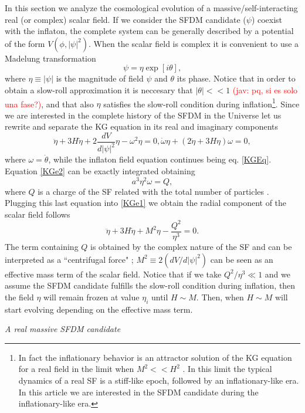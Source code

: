 \documentclass[amssymb,twocolumn,prd,nofootinbib,showpacs]{revtex4-1}
\newcommand{\jav}[1]{\textcolor{red}{(jav: #1)}}
\begin{document}
In this section we analyze the cosmological evolution of a massive/self-interacting real (or complex) scalar field. 
If we consider the SFDM candidate ($\psi$) coexist with the inflaton, the complete system can be generally 
described by a potential of the form $V(\phi,|\psi|^2)$. When the scalar field is complex it is convenient 
to use a Madelung transformation \cite{madelung}
\begin{equation}
\psi = \eta \exp[i\theta],
\end{equation}
where $\eta\equiv |\psi|$ is the magnitude of field $\psi$ and $\theta$ its phase.
Notice that in order to obtain a slow-roll approximation it is neccesary that $|\theta|<<1$ \jav{pq, si es solo una fase?},
 and that also $\eta$ satisfies the slow-roll condition during 
 inflation\footnote{In fact the inflationary behavior is an attractor solution of the KG equation 
 for a real field in the limit when $M^2<<H^2$ \cite{atractorinf1,atractorinf2}. 
 In this limit the typical dynamics of a real SF is a stiff-like epoch, followed by an inflationary-like era. 
 In this article we are interested in the SFDM 
 candidate during the inflationary-like era.}.
Since we are interested in the complete history of the SFDM in the Universe let us 
rewrite and separate the KG equation in its real and imaginary components
\begin{subequations}\label{KESFDM}
\begin{equation}\label{KGe1}
\ddot\eta+3H\dot\eta+2\frac{dV}{d|\psi|^2}\eta-\omega^2\eta= 0,
\end{equation}
\begin{equation}\label{KGe2}
\dot\omega \eta + (2\dot\eta+3H\eta)\omega=0,
\end{equation}
\end{subequations}
where $\omega = \dot \theta$, while the inflaton field equation continues 
being eq. \eqref{KGEq}. Equation \eqref{KGe2} can be exactly integrated obtaining 
\begin{equation}
a^3\eta^2\omega=Q,
\end{equation}
where $Q$ is a charge of the SF related with the total number of 
particles \cite{SFphi42,charge1,SFphi41,charge3,charge4}. Plugging this last equation into \eqref{KGe1} we obtain
the radial component of the scalar field follows
\begin{equation}\label{KGe3}
\ddot\eta+3H\dot\eta+M^2\eta-\frac{Q^2}{\eta^3}= 0.
\end{equation}
The term containing $Q$ is obtained by the complex nature of the SF \cite{SFphi42} and can be interpreted 
as a ``centrifugal force" \cite{charge4}; $M^2\equiv 2(dV/d|\psi|^2)$ can be seen as an effective mass term 
of the scalar field. Notice that if we take $Q^2/\eta^3\ll 1$ and we assume the SFDM candidate fulfills 
the slow-roll condition during inflation, then the field $\eta$ will remain frozen at value $\eta_i$ until $H\sim M$. 
Then, when $H\sim M$ will start evolving depending on the effective mass term.
\begin{center}
\textit{A real massive SFDM candidate}
\end{center}
\end{document}
